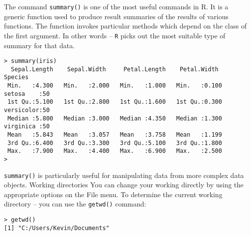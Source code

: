 \documentclass{beamer}
\begin{document}
\begin{frame}[fragile]
The command \texttt{summary()} is one of the most useful commands in R. It is a generic function used to produce result summaries of the results of various functions. The function invokes particular methods which depend on the class of the first argument. 
In other words – \texttt{R} picks out the most suitable type of summary for that data.
{
	\small
\begin{framed}
\begin{verbatim}
> summary(iris)
  Sepal.Length    Sepal.Width     Petal.Length    Petal.Width          Species  
 Min.   :4.300   Min.   :2.000   Min.   :1.000   Min.   :0.100   setosa    :50  
 1st Qu.:5.100   1st Qu.:2.800   1st Qu.:1.600   1st Qu.:0.300   versicolor:50  
 Median :5.800   Median :3.000   Median :4.350   Median :1.300   virginica :50  
 Mean   :5.843   Mean   :3.057   Mean   :3.758   Mean   :1.199                  
 3rd Qu.:6.400   3rd Qu.:3.300   3rd Qu.:5.100   3rd Qu.:1.800                  
 Max.   :7.900   Max.   :4.400   Max.   :6.900   Max.   :2.500                  
>
\end{verbatim}
\end{framed}
}
\end{frame}
\begin{frame}[fragile]
\texttt{summary()} is particularly useful for manipulating data from more complex data objects.
Working directories
You can change your working directly by using the appropriate options on the File menu.
To determine the current working directory – you can use the \texttt{getwd()} command:	
\begin{framed}
\begin{verbatim}
> getwd()
[1] "C:/Users/Kevin/Documents"
\end{verbatim}
\end{framed}
\end{frame}
\end{document}
